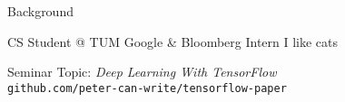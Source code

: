 
\begin{slide}{Background}
  \centering
  \begin{itemize}
    \pitem CS Student @ TUM
    \pitem Google \& Bloomberg Intern
    \pitem I like cats
  \end{itemize}
  \pause
  \vspace{0.4cm}
  Seminar Topic: \emph{Deep Learning With TensorFlow}\\
  \vspace{0.2cm}
  \texttt{github.com/peter-can-write/tensorflow-paper}
\end{slide}
